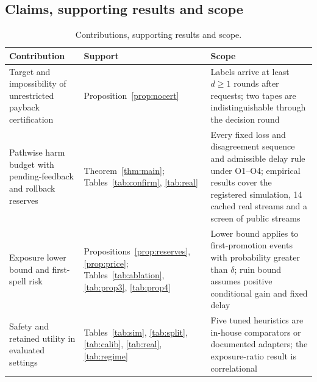 \documentclass[10pt]{article}
\theoremstyle{plain}
\theoremstyle{definition}
\begin{document}
\subsection*{Claims, supporting results and scope}\label{app:claims}
\begin{table}[!htbp]
\caption{Contributions, supporting results and scope.}\label{tab:claims}
\centering\small
\begin{tabular}{@{}>{\raggedright\arraybackslash}p{4.5cm} >{\raggedright\arraybackslash}p{4.8cm} >{\raggedright\arraybackslash}p{5.6cm}@{}}
\toprule
Contribution & Support & Scope \\
\midrule
Target and impossibility of unrestricted payback certification & Proposition~\ref{prop:nocert} & Labels arrive at least $d\ge1$ rounds after requests; two tapes are indistinguishable through the decision round \\
Pathwise harm budget with pending-feedback and rollback reserves & Theorem~\ref{thm:main}; Tables~\ref{tab:confirm}, \ref{tab:real} & Every fixed loss and disagreement sequence and admissible delay rule under O1--O4; empirical results cover the registered simulation, 14 cached real streams and a screen of \ScreenPool{} public streams \\
Exposure lower bound and first-spell risk & Propositions~\ref{prop:reserves}, \ref{prop:price}; Tables~\ref{tab:ablation}, \ref{tab:prop3}, \ref{tab:prop4} & Lower bound applies to first-promotion events with probability greater than $\delta$; ruin bound assumes positive conditional gain and fixed delay \\
Safety and retained utility in evaluated settings & Tables~\ref{tab:sim}, \ref{tab:split}, \ref{tab:calib}, \ref{tab:real}, \ref{tab:regime} & Five tuned heuristics are in-house comparators or documented adapters; the exposure-ratio result is correlational \\
\bottomrule
\end{tabular}
\end{table}
\begin{table}[!htbp]
\caption{Running example ($k=\ExK$, $R=\ExR$, $d=\ExD$, full sampling, every round exposed, promotion at round 1): the check $W$ at the $n$-th exposed round on a tape where every round is harmful and on one where every round benefits the challenger.}\label{tab:example}
\centering\small

\end{table}
\end{document}
